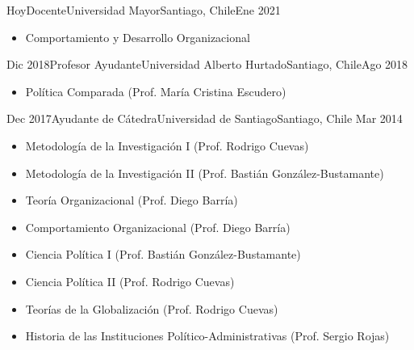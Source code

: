 





\begin{experiences}
  \experience
    {Hoy}{Docente}{Universidad Mayor}{Santiago, Chile}{Ene 2021}
    {\begin{itemize}
    \item Comportamiento y Desarrollo Organizacional
    \end{itemize}}
    {}
\end{experiences}
\vspace{-2mm}

\begin{experiences}
  \experience
    {Dic 2018}{Profesor Ayudante}{Universidad Alberto Hurtado}{Santiago, Chile}{Ago 2018}
    {\begin{itemize}
    \item Política Comparada {\small (Prof. María Cristina Escudero)}
    \end{itemize}}
    {}
\end{experiences}
\vspace{-2mm}

\begin{experiences}
  \emptySeparator 
  \experience 
    {Dec 2017}{Ayudante de Cátedra}{Universidad de Santiago}{Santiago, Chile} {Mar 2014}
    {\begin{itemize}
    \item Metodología de la Investigación I {\small (Prof. Rodrigo Cuevas)}
    \item Metodología de la Investigación II {\small (Prof. Bastián González-Bustamante)}
    \item Teoría Organizacional {\small (Prof. Diego Barría)}
    \item Comportamiento Organizacional {\small (Prof. Diego Barría)}
    \item Ciencia Política I {\small (Prof. Bastián González-Bustamante)}
    \item Ciencia Política II {\small (Prof. Rodrigo Cuevas)}
	\item Teorías de la Globalización {\small (Prof. Rodrigo Cuevas)}
	\item Historia de las Instituciones Político-Administrativas {\small (Prof. Sergio Rojas)}
    \end{itemize}}
    {}
\end{experiences}
\vspace{-2mm}


